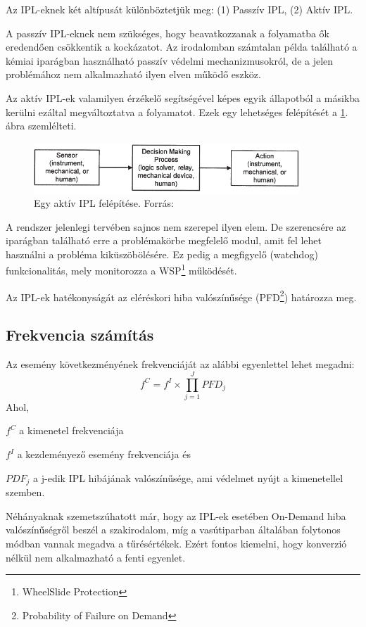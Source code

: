Az IPL-eknek két altípusát különböztetjük meg: (1) Passzív IPL, (2) Aktív IPL.

A passzív IPL-eknek nem szükséges, hogy beavatkozzanak a folyamatba ők eredendően csökkentik a kockázatot.
Az irodalomban számtalan példa található a kémiai iparágban használható passzív védelmi mechanizmusokról, de a jelen problémához nem alkalmazható ilyen elven működő eszköz.

Az aktív IPL-ek valamilyen érzékelő segítségével képes egyik állapotból a másikba kerülni ezáltal megváltoztatva a folyamatot.
Ezek egy lehetséges felépítését a \ref{fig:activeIPL}. ábra szemlélteti.
\begin{figure}
    \footnotesize
    \centering
    \includegraphics[width=100mm, keepaspectratio]{figures/lopa_active_IPL.png}
    \caption{Egy aktív IPL felépítése. Forrás: \cite{LOPABOOK}}
    \label{fig:activeIPL}
\end{figure}

A rendszer jelenlegi tervében sajnos nem szerepel ilyen elem. 
De szerencsére az iparágban található erre a problémakörbe megfelelő modul, amit fel lehet használni a probléma kiküszöbölésére.
Ez pedig a megfigyelő (watchdog) funkcionalitás, mely monitorozza a WSP\footnote{WheelSlide Protection} működését.

Az IPL-ek hatékonyságát az eléréskori hiba valószínűsége (PFD\footnote{Probability of Failure on Demand}) határozza meg.

\subsection{Frekvencia számítás}
Az esemény következményének frekvenciáját az alábbi egyenlettel lehet megadni:
\begin{equation}
    f^C = f^I\times\prod^{J}_{j=1}{{PFD}_j}
\end{equation}
\label{eq:lopa}
Ahol,

$f^C$ a kimenetel frekvenciája

$f^I$ a kezdeményező esemény frekvenciája és

$PDF_j$ a j-edik IPL hibájának valószínűsége, ami védelmet nyújt a kimenetellel szemben.

Néhányaknak szemetszúhatott már, hogy az IPL-ek esetében On-Demand hiba valószínűségről beszél a szakirodalom, míg a vasútiparban általában folytonos módban vannak megadva a tűrésértékek.
Ezért fontos kiemelni, hogy konverzió nélkül nem alkalmazható a fenti egyenlet.

